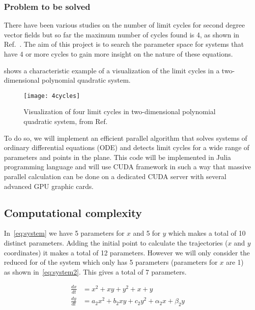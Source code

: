 \pagebreak
\subsubsection{Problem to be solved}

There have been various studies on the number of limit cycles for second degree
vector fields but so far the maximum number of cycles found is 4, as shown in
Ref.~\cite{kuznetsov_visualization_2013}. The aim of this project is to search
the parameter space for systems that have 4 or more cycles to gain more insight
on the nature of these equations.

 shows a characteristic example of a visualization of the
limit cycles in a two-dimensional polynomial quadratic system.

\begin{figure}[H]
    \centering
    \texttt{[image: 4cycles]}
    \caption{Visualization of four limit cycles in two-dimensional polynomial quadratic system, from Ref.~\cite{kuznetsov_visualization_2013}
    }%
    \label{fig:kuznetsov}
\end{figure}

To do so, we will implement an efficient parallel algorithm that solves systems
of ordinary differential equations (ODE) and detects limit cycles for a wide
range of parameters and points in the plane.  This code will be implemented in
Julia programming language and will use CUDA framework in such a way that
massive parallel calculation can be done on a dedicated CUDA server with several
advanced GPU graphic cards.

\pagebreak

\subsection{Computational complexity}

In~\cref{eq:system} we have 5 parameters for $x$ and 5 for $y$ which makes a
total of 10 distinct parameters. Adding the initial point to calculate the
trajectories ($x$ and $y$ coordinates) it makes a total of 12 parameters.
However we will only consider the reduced for of the system which only has 5
parameters (parameters for $x$ are 1) as shown in~\cref{eq:system2}. This gives
a total of 7 parameters.

\begin{align}\label{eq:system2}
    \frac{dx}{dt} &= x^2 + xy + y^2 + x + y \nonumber \\
    \frac{dy}{dt} &= a_2x^2 + b_2xy + c_2y^2 + \alpha_2x + \beta_2y
\end{align}


